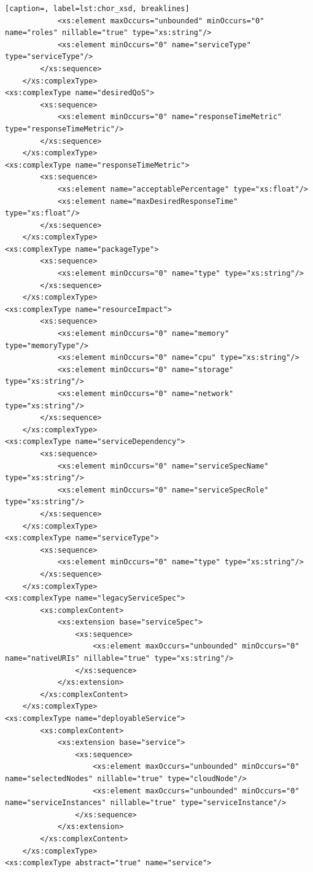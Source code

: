 {\begin{lstlisting}[caption=, label=lst:chor_xsd, breaklines]
            <xs:element maxOccurs="unbounded" minOccurs="0" name="roles" nillable="true" type="xs:string"/>
            <xs:element minOccurs="0" name="serviceType" type="serviceType"/>
        </xs:sequence>
    </xs:complexType>
<xs:complexType name="desiredQoS">
        <xs:sequence>
            <xs:element minOccurs="0" name="responseTimeMetric" type="responseTimeMetric"/>
        </xs:sequence>
    </xs:complexType>
<xs:complexType name="responseTimeMetric">
        <xs:sequence>
            <xs:element name="acceptablePercentage" type="xs:float"/>
            <xs:element name="maxDesiredResponseTime" type="xs:float"/>
        </xs:sequence>
    </xs:complexType>
<xs:complexType name="packageType">
        <xs:sequence>
            <xs:element minOccurs="0" name="type" type="xs:string"/>
        </xs:sequence>
    </xs:complexType>
<xs:complexType name="resourceImpact">
        <xs:sequence>
            <xs:element minOccurs="0" name="memory" type="memoryType"/>
            <xs:element minOccurs="0" name="cpu" type="xs:string"/>
            <xs:element minOccurs="0" name="storage" type="xs:string"/>
            <xs:element minOccurs="0" name="network" type="xs:string"/>
        </xs:sequence>
    </xs:complexType>
<xs:complexType name="serviceDependency">
        <xs:sequence>
            <xs:element minOccurs="0" name="serviceSpecName" type="xs:string"/>
            <xs:element minOccurs="0" name="serviceSpecRole" type="xs:string"/>
        </xs:sequence>
    </xs:complexType>
<xs:complexType name="serviceType">
        <xs:sequence>
            <xs:element minOccurs="0" name="type" type="xs:string"/>
        </xs:sequence>
    </xs:complexType>
<xs:complexType name="legacyServiceSpec">
        <xs:complexContent>
            <xs:extension base="serviceSpec">
                <xs:sequence>
                    <xs:element maxOccurs="unbounded" minOccurs="0" name="nativeURIs" nillable="true" type="xs:string"/>
                </xs:sequence>
            </xs:extension>
        </xs:complexContent>
    </xs:complexType>
<xs:complexType name="deployableService">
        <xs:complexContent>
            <xs:extension base="service">
                <xs:sequence>
                    <xs:element maxOccurs="unbounded" minOccurs="0" name="selectedNodes" nillable="true" type="cloudNode"/>
                    <xs:element maxOccurs="unbounded" minOccurs="0" name="serviceInstances" nillable="true" type="serviceInstance"/>
                </xs:sequence>
            </xs:extension>
        </xs:complexContent>
    </xs:complexType>
<xs:complexType abstract="true" name="service">

\end{lstlisting}}
